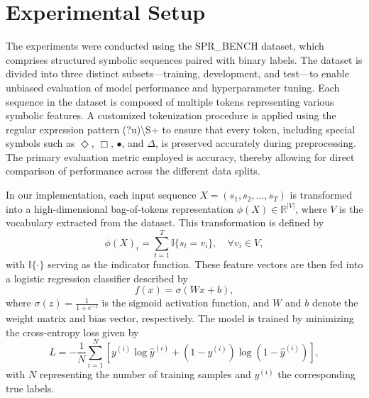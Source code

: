\documentclass{article}
\begin{document}
\section{Experimental Setup}
\noindent The experiments were conducted using the SPR\_BENCH dataset, which comprises structured symbolic sequences paired with binary labels. The dataset is divided into three distinct subsets—training, development, and test—to enable unbiased evaluation of model performance and hyperparameter tuning. Each sequence in the dataset is composed of multiple tokens representing various symbolic features. A customized tokenization procedure is applied using the regular expression pattern (?u)\textbackslash S+ to ensure that every token, including special symbols such as \(\Diamond\), \(\Box\), \(\bullet\), and \(\Delta\), is preserved accurately during preprocessing. The primary evaluation metric employed is accuracy, thereby allowing for direct comparison of performance across the different data splits.

\bigskip

\noindent In our implementation, each input sequence \( X = (s_1, s_2, \dots, s_T) \) is transformed into a high-dimensional bag-of-tokens representation \(\phi(X) \in \mathbb{R}^{|V|}\), where \(V\) is the vocabulary extracted from the dataset. This transformation is defined by 
\[
\phi(X)_i = \sum_{t=1}^{T} \mathbb{I}\{ s_t = v_i \}, \quad \forall v_i \in V,
\]
with \(\mathbb{I}\{\cdot\}\) serving as the indicator function. These feature vectors are then fed into a logistic regression classifier described by
\[
f(x) = \sigma(Wx + b),
\]
where \(\sigma(z) = \frac{1}{1+e^{-z}}\) is the sigmoid activation function, and \(W\) and \(b\) denote the weight matrix and bias vector, respectively. The model is trained by minimizing the cross-entropy loss given by
\[
L = -\frac{1}{N}\sum_{i=1}^{N}\left[y^{(i)}\log\hat{y}^{(i)} + (1-y^{(i)})\log(1-\hat{y}^{(i)})\right],
\]
with \(N\) representing the number of training samples and \(y^{(i)}\) the corresponding true labels.

\bigskip
\end{document}
